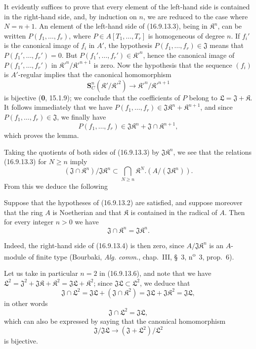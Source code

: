 It evidently suffices to prove that every element of the left-hand side is
contained in the right-hand side, and, by induction on $n$, we are reduced
to the case where $N=n+1$. An element of the left-hand side of (16.9.13.3),
being in $\mathfrak{K}^n$, can be written $P(f_1,\ldots,f_r)$, where
$P\in A[T_1,\ldots,T_r]$ is homogeneous of degree $n$. If $f_i'$ is the
canonical image of $f_i$ in $A'$, the hypothesis
$P(f_1,\ldots,f_r)\in\mathfrak{J}$ means that
$P(f_1',\ldots,f_r')=0$. But
$P(f_1',\ldots,f_r')\in\mathfrak{K}'^n$, hence the canonical image of
$P(f_1',\ldots,f_r')$ in
$\mathfrak{K}'^n/\mathfrak{K}'^{n+1}$ is zero. Now the hypothesis that the
sequence $(f_i)$ is $A'$-regular implies that the canonical homomorphism
\[
  \mathbf{S}_C^n(\mathfrak{K}'/\mathfrak{K}'^2)
  \longrightarrow\mathfrak{K}'^n/\mathfrak{K}'^{n+1}
\]
is bijective (\textbf{0}, 15.1.9); we conclude that the coefficients of $P$ belong
to $\mathfrak{L}=\mathfrak{J}+\mathfrak{K}$. It follows immediately that we
have $P(f_1,\ldots,f_r)\in\mathfrak{J}\mathfrak{K}^n+\mathfrak{K}^{n+1}$, and
since $P(f_1,\ldots,f_r)\in\mathfrak{J}$, we finally have
\[
  P(f_1,\ldots,f_r)
  \in\mathfrak{J}\mathfrak{K}^n
    +\mathfrak{J}\cap\mathfrak{K}^{n+1},
\]
which proves the lemma.

Taking the quotients of both sides of (16.9.13.3) by
$\mathfrak{J}\mathfrak{K}^n$, we see that the relations (16.9.13.3) for
$N\geq n$ imply
\[
  (\mathfrak{J}\cap\mathfrak{K}^n)/\mathfrak{J}\mathfrak{K}^n
  \subset\bigcap_{N\geq n}\mathfrak{K}^N
    .(A/(\mathfrak{J}\mathfrak{K}^n)).
  \tag{16.9.13.4}
  \label{IV.16.9.13.4}
\]
From this we deduce the following

\begin{corollary}[16.9.13.5]
\label{IV.16.9.13.5}
Suppose that the hypotheses of \textup{(16.9.13.2)} are satisfied, and suppose
moreover that the ring $A$ is Noetherian and that $\mathfrak{K}$ is contained
in the radical of $A$. Then for every integer $n>0$ we have
\[
  \mathfrak{J}\cap\mathfrak{K}^n=\mathfrak{J}\mathfrak{K}^n.
  \tag{16.9.13.6}
  \label{IV.16.9.13.6}
\]
\end{corollary}

Indeed, the right-hand side of (16.9.13.4) is then zero, since
$A/\mathfrak{J}\mathfrak{K}^n$ is an $A$-module of finite type (Bourbaki,
\emph{Alg. comm.}, chap.~III, §~3, n\textsuperscript{o}~3, prop.~6).

Let us take in particular $n=2$ in (16.9.13.6), and note that we have
$\mathfrak{L}^2=\mathfrak{J}^2+\mathfrak{J}\mathfrak{K}+\mathfrak{K}^2
=\mathfrak{J}\mathfrak{L}+\mathfrak{K}^2$; since
$\mathfrak{J}\mathfrak{L}\subset\mathfrak{L}^2$, we deduce that
\[
  \mathfrak{J}\cap\mathfrak{L}^2
  =\mathfrak{J}\mathfrak{L}+(\mathfrak{J}\cap\mathfrak{K}^2)
  =\mathfrak{J}\mathfrak{L}+\mathfrak{J}\mathfrak{K}^2
  =\mathfrak{J}\mathfrak{L},
\]
in other words
\[
  \mathfrak{J}\cap\mathfrak{L}^2=\mathfrak{J}\mathfrak{L},
  \tag{16.9.13.7}
  \label{IV.16.9.13.7}
\]
which can also be expressed by saying that the canonical homomorphism
\[
  \mathfrak{J}/\mathfrak{J}\mathfrak{L}
  \longrightarrow(\mathfrak{J}+\mathfrak{L}^2)/\mathfrak{L}^2
\]
is bijective.


